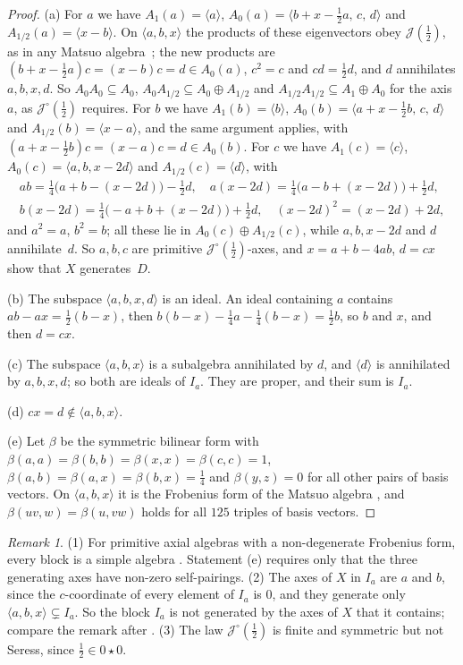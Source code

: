 \documentclass[11pt]{article}
\theoremstyle{definition}
\theoremstyle{remark}
\newtheorem{remark}[lemma]{Remark}
\newcommand{\cJ}{\mathcal J}
\newcommand{\Jo}{\cJ^{\circ}}
\newcommand{\half}{\tfrac12}
\begin{document}
\begin{proof}
(a) For $a$ we have $A_1(a)=\langle a\rangle$, $A_0(a)=\langle
b+x-\half a,\,c,\,d\rangle$ and $A_{1/2}(a)=\langle x-b\rangle$. On
$\langle a,b,x\rangle$ the products of these eigenvectors obey
$\cJ(\half)$, as in any Matsuo algebra~\cite[\S2.1]{gs}; the new products
are $(b+x-\half a)c=(x-b)c=d\in A_0(a)$, $c^2=c$ and $cd=\half d$, and $d$
annihilates $a,b,x,d$. So $A_0A_0\subseteq A_0$,
$A_0A_{1/2}\subseteq A_0\oplus A_{1/2}$ and $A_{1/2}A_{1/2}\subseteq
A_1\oplus A_0$ for the axis $a$, as $\Jo(\half)$ requires. For $b$ we have
$A_1(b)=\langle b\rangle$, $A_0(b)=\langle a+x-\half b,\,c,\,d\rangle$
and $A_{1/2}(b)=\langle x-a\rangle$, and the same argument applies, with
$(a+x-\half b)c=(x-a)c=d\in A_0(b)$. For $c$ we have $A_1(c)=\langle c\rangle$, $A_0(c)=\langle
a,b,x-2d\rangle$ and $A_{1/2}(c)=\langle d\rangle$, with
\begin{gather*}
ab=\tfrac14\bigl(a+b-(x-2d)\bigr)-\tfrac12d,\quad
a(x-2d)=\tfrac14\bigl(a-b+(x-2d)\bigr)+\tfrac12d,\\
b(x-2d)=\tfrac14\bigl(-a+b+(x-2d)\bigr)+\tfrac12d,\quad
(x-2d)^2=(x-2d)+2d,
\end{gather*}
and $a^2=a$, $b^2=b$; all these lie in $A_0(c)\oplus A_{1/2}(c)$, while
$a,b,x-2d$ and $d$ annihilate~$d$.
So $a,b,c$ are primitive $\Jo(\half)$-axes, and $x=a+b-4ab$, $d=cx$ show
that $X$ generates~$D$.

(b) The subspace $\langle a,b,x,d\rangle$ is an ideal. An ideal containing
$a$ contains $ab-ax=\half(b-x)$, then
$b(b-x)-\frac14a-\frac14(b-x)=\half b$, so $b$ and $x$, and then $d=cx$.

(c) The subspace $\langle a,b,x\rangle$ is a subalgebra annihilated by $d$,
and $\langle d\rangle$ is annihilated by $a,b,x,d$; so both are ideals of
$I_a$. They are proper, and their sum is $I_a$.

(d) $cx=d\notin\langle a,b,x\rangle$.

(e) Let $\beta$ be the symmetric bilinear form with
$\beta(a,a)=\beta(b,b)=\beta(x,x)=\beta(c,c)=1$,
$\beta(a,b)=\beta(a,x)=\beta(b,x)=\frac14$ and $\beta(y,z)=0$ for all other
pairs of basis vectors. On $\langle a,b,x\rangle$ it is the Frobenius form of
the Matsuo algebra \cite[\S2.1]{gs}, and $\beta(uv,w)=\beta(u,vw)$ holds for
all $125$ triples of basis vectors.
\end{proof}

\begin{remark}\label{rem:D}
(1) For primitive axial algebras with a non-degenerate Frobenius form, every
block is a simple algebra \cite[Prop.~6.2]{msz}. Statement (e) requires only
that the three generating axes have non-zero self-pairings.
(2) The axes of $X$ in $I_a$ are $a$ and $b$, since the $c$-coordinate of
every element of $I_a$ is $0$, and they generate only $\langle
a,b,x\rangle\subsetneq I_a$. So the block $I_a$ is not generated by the axes
of $X$ that it contains; compare the remark after \cite[Cor.~3.5]{msz}.
(3) The law $\Jo(\half)$ is finite and symmetric but not Seress, since
$\half\in0\star0$.
\end{remark}
\fi
\end{document}
